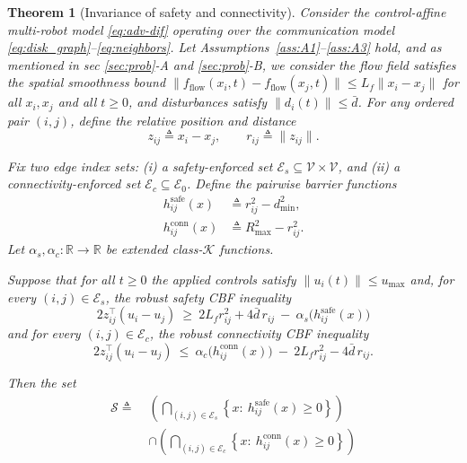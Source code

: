 \documentclass[conference]{IEEEconf}
\theoremstyle{plain}
\newtheorem{theorem}{Theorem} %
\begin{document}
\begin{theorem}[Invariance of safety and connectivity]
\label{thm:robust-invariance}
Consider the control-affine multi-robot model \eqref{eq:adv-dif} operating over the communication model \eqref{eq:disk_graph}--\eqref{eq:neighbors}. Let Assumptions~\ref{ass:A1}--\ref{ass:A3} hold, and as mentioned in sec \ref{sec:prob}-A and \ref{sec:prob}-B, we consider the flow field satisfies the spatial smoothness bound
\(
\|f_{\text{flow}}(x_i,t)-f_{\text{flow}}(x_j,t)\|\le L_f\|x_i-x_j\|
\)
for all $x_i,x_j$ and all $t\ge 0$, and disturbances satisfy $\|d_i(t)\|\le \bar d$.
For any ordered pair $(i,j)$, define the relative position and distance
\[
z_{ij} \triangleq x_i-x_j,\qquad r_{ij}\triangleq \|z_{ij}\|.
\]

Fix two edge index sets:
(i) a \emph{safety-enforced} set $\mathcal{E}_s\subseteq \mathcal{V}\times\mathcal{V}$, and
(ii) a \emph{connectivity-enforced} set $\mathcal{E}_c \subseteq \mathcal{E}_0$.
Define the pairwise barrier functions
\begin{align}
h^{\mathrm{safe}}_{ij}(x) &\triangleq r_{ij}^2 - d_{\min}^2,
\label{eq:h_safe}\\
h^{\mathrm{conn}}_{ij}(x) &\triangleq R_{\max}^2 - r_{ij}^2.
\label{eq:h_conn}
\end{align}
Let $\alpha_s,\alpha_c:\mathbb{R}\to\mathbb{R}$ be extended class-$\mathcal{K}$ functions.

Suppose that for all $t\ge 0$ the applied controls satisfy $\|u_i(t)\|\le u_{\max}$ and, for every $(i,j)\in \mathcal{E}_s$, the \emph{robust safety CBF inequality}
\begin{equation}
{
2 z_{ij}^\top (u_i-u_j)\ \ge\ 2L_f r_{ij}^2 + 4\bar d\, r_{ij}\ -\ \alpha_s\!\big(h^{\mathrm{safe}}_{ij}(x)\big)
}
\label{eq:robust_safe_cbf}
\end{equation}
and for every $(i,j)\in \mathcal{E}_c$, the \emph{robust connectivity CBF inequality}
\begin{equation}
{
2 z_{ij}^\top (u_i-u_j)\ \le\ \alpha_c\!\big(h^{\mathrm{conn}}_{ij}(x)\big)\ -\ 2L_f r_{ij}^2 - 4\bar d\, r_{ij}.
}
\label{eq:robust_conn_cbf}
\end{equation}

Then the set
\begin{equation}
\label{eq:overall_safe_set}
\begin{aligned}
\mathcal{S}\triangleq\;
&\left(\bigcap_{(i,j)\in \mathcal{E}_s}
\left\{x:\ h^{\mathrm{safe}}_{ij}(x)\ge 0\right\}\right) \\
&\cap
\left(\bigcap_{(i,j)\in \mathcal{E}_c}
\left\{x:\ h^{\mathrm{conn}}_{ij}(x)\ge 0\right\}\right)
\end{aligned}
\end{equation}


\end{theorem}
\end{document}

